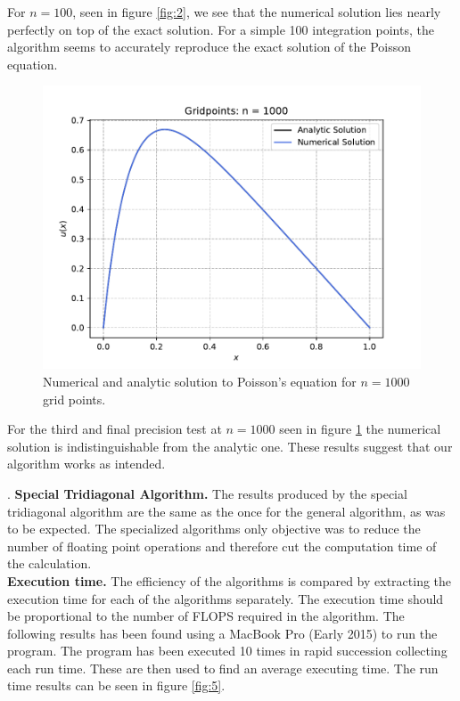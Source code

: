\documentclass[a4paper,10pt]{article}
\begin{document}
For $n = 100$, seen in figure \ref{fig:2}, we see that the numerical solution lies nearly perfectly on top of the exact solution. For a simple 100 integration points, the algorithm seems to accurately reproduce the exact solution of the Poisson equation.


\begin{figure}[h]
  \centering
  \includegraphics[width=0.9\linewidth]{figures/fig_1000_b.pdf}
  \caption{Numerical and analytic solution to Poisson's equation for $n = 1000$ grid points.}
  \label{fig:3}
\end{figure}

For the third and final precision test at $n = 1000$ seen in figure \ref{fig:3} the numerical solution is indistinguishable from the analytic one. These results suggest that our algorithm works as intended.

\bigskip

. \textbf{Special Tridiagonal Algorithm.}
The results produced by the special tridiagonal algorithm are the same as the once for the general algorithm, as was to be expected. The specialized algorithms only objective was to reduce the number of floating point operations and therefore cut the computation time of the calculation. \\

 \textbf{Execution time.}
The efficiency of the algorithms is compared by extracting the execution time for each of the algorithms separately. The execution time should be proportional to the number of FLOPS required in the algorithm. The following results has been found using a MacBook Pro (Early 2015) to run the program. The program has been executed 10 times in rapid succession collecting each run time. These are then used to find an average executing time. The run time results can be seen in figure \ref{fig:5}. 
\end{document}
